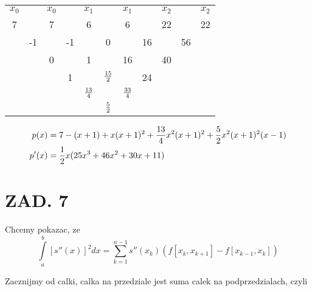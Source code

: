 \documentclass{article}[16pt]
\begin{document}
\begin{center}
    \begin{tabular}{ c c c c c c c c c c c }
        $x_0$ & & $x_0$ & & $x_1$ & & $x_1$ & & $x_2$ & & $x_2$\\
        7     & &  7    & &  6    & &  6    & &  22   & &  22\\
        &   -1    &  & -1   & &   0    & &  16   & &    56\\
        &    &     0    & &  1   & &    16   & &    40\\
        &    &     &    1   & &   ${15\over2}$ && 24\\
        & & & & ${13\over4}$ && ${33\over4}$\\
        & & & & & ${5\over2}$
    \end{tabular}
\end{center}

\begin{align*}
    p(x)&=7-(x+1)+x(x+1)^2+{13\over4}x^2(x+1)^2+{5\over2}x^2(x+1)^2(x-1)\\
    p'(x)&=\frac12x(25x^3+46x^2+30x+11)
\end{align*}


\section*{ZAD. 7}

Chcemy pokazac, ze
$$\int\limits_a^b[s''(x)]^2dx=\sum\limits_{k=1}^{n-1}s''(x_k)(f[x_k,x_{k+1}]-f[x_{k-1},x_k])$$

Zacznijmy od calki, calka na przedziale jest suma calek na podprzedzialach, czyli
\end{document}
